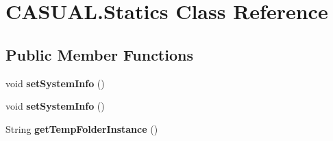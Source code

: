 \hypertarget{classCASUAL_1_1Statics}{\section{C\-A\-S\-U\-A\-L.\-Statics Class Reference}
\label{classCASUAL_1_1Statics}
}
\subsection*{Public Member Functions}
\begin{DoxyCompactItemize}
\item 
\hypertarget{classCASUAL_1_1Statics_a8c8f9fbc5ae10e7d178ceb03d6cbee6d}{void {\bfseries set\-System\-Info} ()}\label{classCASUAL_1_1Statics_a8c8f9fbc5ae10e7d178ceb03d6cbee6d}

\item 
\hypertarget{classCASUAL_1_1Statics_a8c8f9fbc5ae10e7d178ceb03d6cbee6d}{void {\bfseries set\-System\-Info} ()}\label{classCASUAL_1_1Statics_a8c8f9fbc5ae10e7d178ceb03d6cbee6d}

\item 
\hypertarget{classCASUAL_1_1Statics_a0bc726921a7f0355dbc3cbb183021ee8}{String {\bfseries get\-Temp\-Folder\-Instance} ()}\label{classCASUAL_1_1Statics_a0bc726921a7f0355dbc3cbb183021ee8}

\end{DoxyCompactItemize}
